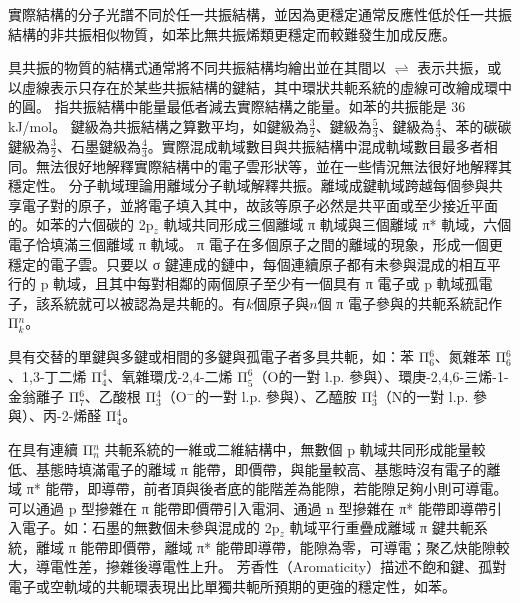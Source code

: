 \documentclass[a4paper,12pt]{report}
\begin{document}
實際結構的分子光譜不同於任一共振結構，並因為更穩定通常反應性低於任一共振結構的非共振相似物質，如苯比無共振烯類更穩定而較難發生加成反應。

具共振的物質的結構式通常將不同共振結構均繪出並在其間以 $\rightleftharpoons$ 表示共振，或以虛線表示只存在於某些共振結構的鍵結，其中環狀共軛系統的虛線可改繪成環中的圓。
指共振結構中能量最低者減去實際結構之能量。如苯的共振能是 36 kJ/mol。
鍵級為共振結構之算數平均，如鍵級為$\frac{3}{2}$、鍵級為$\frac{5}{3}$、鍵級為$\frac{4}{3}$、苯的碳碳鍵級為$\frac{3}{2}$、石墨鍵級為$\frac{4}{3}$。實際混成軌域數目與共振結構中混成軌域數目最多者相同。無法很好地解釋實際結構中的電子雲形狀等，並在一些情況無法很好地解釋其穩定性。
分子軌域理論用離域分子軌域解釋共振。離域成鍵軌域跨越每個參與共享電子對的原子，並將電子填入其中，故該等原子必然是共平面或至少接近平面的。如苯的六個碳的 2p$_z$ 軌域共同形成三個離域 π 軌域與三個離域 π* 軌域，六個電子恰填滿三個離域 π 軌域。
π 電子在多個原子之間的離域的現象，形成一個更穩定的電子雲。只要以 σ 鍵連成的鏈中，每個連續原子都有未參與混成的相互平行的 p 軌域，且其中每對相鄰的兩個原子至少有一個具有 π 電子或 p 軌域孤電子，該系統就可以被認為是共軛的。有$k$個原子與$n$個 π 電子參與的共軛系統記作 Π$_k^n$。

具有交替的單鍵與多鍵或相間的多鍵與孤電子者多具共軛，如：苯 Π$_6^6$、氮雜苯 Π$_6^6$、1,3-丁二烯 Π$_4^4$、氧雜環戊-2,4-二烯 Π$_5^6$（O的一對 l.p. 參與）、環庚-2,4,6-三烯-1-金翁離子 Π$_7^6$、乙酸根 Π$_3^4$（O$^-$的一對 l.p. 參與）、乙醯胺 Π$_3^4$（N的一對 l.p. 參與）、丙-2-烯醛 Π$_4^4$。

在具有連續 Π$_n^n$ 共軛系統的一維或二維結構中，無數個 p 軌域共同形成能量較低、基態時填滿電子的離域 π 能帶，即價帶，與能量較高、基態時沒有電子的離域 π* 能帶，即導帶，前者頂與後者底的能階差為能隙，若能隙足夠小則可導電。可以通過 p 型摻雜在 π 能帶即價帶引入電洞、通過 n 型摻雜在 π* 能帶即導帶引入電子。如：石墨的無數個未參與混成的 2p$_z$ 軌域平行重疊成離域 π 鍵共軛系統，離域 π 能帶即價帶，離域 π* 能帶即導帶，能隙為零，可導電；聚乙炔能隙較大，導電性差，摻雜後導電性上升。
芳香性（Aromaticity）描述不飽和鍵、孤對電子或空軌域的共軛環表現出比單獨共軛所預期的更強的穩定性，如苯。
\end{document}
